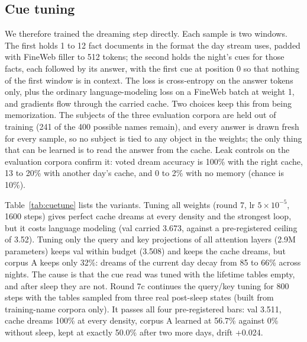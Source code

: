 \documentclass[11pt]{article}
\begin{document}
\subsection{Cue tuning}
\label{sec:cuetune}
We therefore trained the dreaming step directly. Each sample is two windows.
The first holds 1 to 12 fact documents in the format the day stream uses,
padded with FineWeb filler to 512 tokens; the second holds the night's cues for
those facts, each followed by its answer, with the first cue at position 0 so
that nothing of the first window is in context. The loss is cross-entropy on
the answer tokens only, plus the ordinary language-modeling loss on a FineWeb
batch at weight 1, and gradients flow through the carried cache. Two choices
keep this from being memorization. The subjects of the three evaluation corpora
are held out of training (241 of the 400 possible names remain), and every
answer is drawn fresh for every sample, so no subject is tied to any object in
the weights; the only thing that can be learned is to read the answer from the
cache. Leak controls on the evaluation corpora confirm it: voted dream accuracy
is 100\% with the right cache, 13 to 20\% with another day's cache, and 0 to
2\% with no memory (chance is 10\%).

Table~\ref{tab:cuetune} lists the variants. Tuning all weights (round 7, lr
$5\times10^{-5}$, 1600 steps) gives perfect cache dreams at every density and
the strongest loop, but it costs language modeling (val carried 3.673, against
a pre-registered ceiling of 3.52). Tuning only the query and key projections of
all attention layers (2.9M parameters) keeps val within budget (3.508) and keeps
the cache dreams, but corpus A keeps only 32\%: dreams of the current day decay
from 85 to 66\% across nights. The cause is that the cue read was tuned with the
lifetime tables empty, and after sleep they are not. Round 7c continues the
query/key tuning for 800 steps with the tables sampled from three real
post-sleep states (built from training-name corpora only). It passes all four
pre-registered bars: val 3.511, cache dreams 100\% at every density, corpus A
learned at 56.7\% against 0\% without sleep, kept at exactly 50.0\% after two
more days, drift +0.024.
\end{document}
